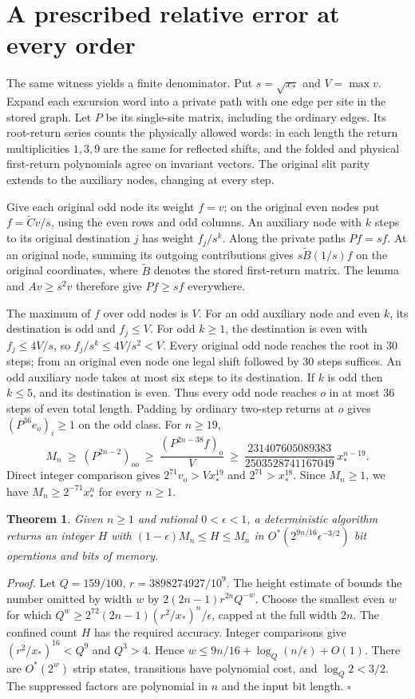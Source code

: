 \documentclass[11pt]{article}
\newtheorem{theorem}{Theorem}
\newcommand{\xstar}{x_*}
\begin{document}
\newpage
\section{A prescribed relative error at every order}
The same witness yields a finite denominator. Put \(s=\sqrt{\xstar}\) and \(V=\max v\). Expand each excursion word into a private path with one edge per site in the stored graph. Let \(P\) be its single-site matrix, including the ordinary edges. Its root-return series counts the physically allowed words: in each length the return multiplicities \(1,3,9\) are the same for reflected shifts, and the folded and physical first-return polynomials agree on invariant vectors. The original slit parity extends to the auxiliary nodes, changing at every step.

Give each original odd node its weight \(f=v\); on the original even nodes put \(f=\widetilde C v/s\), using the even rows and odd columns. An auxiliary node with \(k\) steps to its original destination \(j\) has weight \(f_j/s^k\). Along the private paths \(Pf=sf\). At an original node, summing its outgoing contributions gives \(s\widetilde B(1/s)f\) on the original coordinates, where \(\widetilde B\) denotes the stored first-return matrix. The lemma and \(Av\ge s^2v\) therefore give \(Pf\ge sf\) everywhere.

The maximum of \(f\) over odd nodes is \(V\). For an odd auxiliary node and even \(k\), its destination is odd and \(f_j\le V\). For odd \(k\ge1\), the destination is even with \(f_j\le4V/s\), so \(f_j/s^k\le4V/s^2<V\). Every original odd node reaches the root in 30 steps; from an original even node one legal shift followed by 30 steps suffices. An odd auxiliary node takes at most six steps to its destination. If \(k\) is odd then \(k\le5\), and its destination is even. Thus every odd node reaches \(o\) in at most 36 steps of even total length. Padding by ordinary two-step returns at \(o\) gives \((P^{36}e_o)_i\ge1\) on the odd class. For \(n\ge19\),
\[
 M_n\ \ge\ (P^{2n-2})_{oo}
     \ \ge\ \frac{(P^{2n-38}f)_o}{V}
     \ \ge\ \frac{231407605089383}{2503528741167049}\,\xstar^{n-19}.
\]
Direct integer comparison gives \(2^{71}v_o>V\xstar^{19}\) and \(2^{71}>\xstar^{18}\). Since \(M_n\ge1\), we have \(M_n\ge2^{-71}\xstar^n\) for every \(n\ge1\).

\begin{theorem}
Given \(n\ge1\) and rational \(0<\epsilon<1\), a deterministic algorithm returns an integer \(H\) with \((1-\epsilon)M_n\le H\le M_n\) in \(O^*(2^{9n/16}\epsilon^{-3/2})\) bit operations and bits of memory.
\end{theorem}
\noindent\textit{Proof.}
Let \(Q=159/100\), \(r=3898274927/10^9\). The height estimate of \cite[Sec.~5]{prior} bounds the number omitted by width \(w\) by \(2(2n-1)r^{2n}Q^{-w}\). Choose the smallest even \(w\) for which \(Q^w\ge 2^{72}(2n-1)(r^2/\xstar)^n/\epsilon\), capped at the full width \(2n\). The confined count \(H\) has the required accuracy. Integer comparisons give \((r^2/\xstar)^{16}<Q^9\) and \(Q^3>4\). Hence \(w\le9n/16+\log_Q(n/\epsilon)+O(1)\). There are \(O^*(2^w)\) strip states, transitions have polynomial cost, and \(\log_Q2<3/2\). The suppressed factors are polynomial in \(n\) and the input bit length. \hfill\(\square\)
\end{document}
